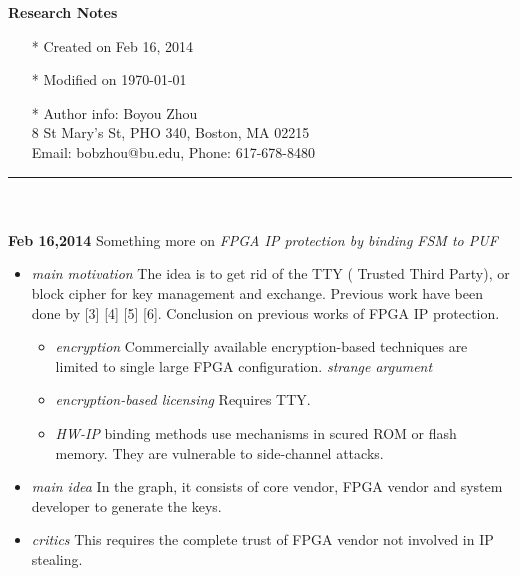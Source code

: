 \documentclass[]{article}
\begin{document}
\pagestyle{empty}
{\large\textbf{Research Notes}}
\begin{itemize}
    \item[*] Created on Feb 16, 2014
    \item[*] Modified on \today
    \item[*] Author info: Boyou Zhou\\
             8 St Mary's St, PHO 340, Boston, MA 02215\\
             Email: bobzhou@bu.edu, Phone: 617-678-8480
\end{itemize}


\rule[-0.1cm]{7.5in}{0.01cm}\\
\\
\noindent \textbf{Feb 16,2014}
Something more on \textit{FPGA IP protection by binding FSM to PUF}
\indent		\begin{itemize}
            \item \textit{main motivation} The idea is to get rid of the TTY (
            Trusted Third Party), or block cipher for key management and
            exchange. Previous work have been done by [3] [4] [5] [6].
            Conclusion on previous works of FPGA IP protection.
                \begin{itemize}
                \item \textit{encryption} Commercially available
                    encryption-based techniques are limited to single large FPGA
                    configuration. \textit{strange argument}
                \item \textit{encryption-based licensing} Requires TTY.
                \item \textit{HW-IP} binding methods use mechanisms in scured
                    ROM or flash memory. They are vulnerable to side-channel
                    attacks.
                \end{itemize}
            \item \textit{main idea} In the graph, it consists of core vendor,
                FPGA vendor and system developer to generate the keys. 
            \item \textit{critics} This requires the complete trust of FPGA
                vendor not involved in IP stealing.
        \end{itemize}
\end{document}
